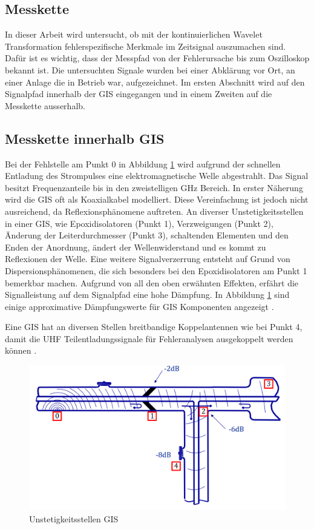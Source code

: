 \begin{refsection}
\section{Messkette}
In dieser Arbeit wird untersucht, ob mit der kontinuierlichen Wavelet Transformation fehlerspezifische Merkmale im Zeitsignal auszumachen sind. 
Dafür ist es wichtig, dass der Messpfad von der Fehlerursache bis zum Oszilloskop bekannt ist. 
Die untersuchten Signale wurden bei einer Abklärung vor Ort, an einer Anlage die in Betrieb war, aufgezeichnet.  
Im ersten Abschnitt wird auf den Signalpfad innerhalb der GIS eingegangen und in einem Zweiten auf die Messkette ausserhalb.
\subsection{Messkette innerhalb GIS}
Bei der Fehlstelle am Punkt 0 in Abbildung \ref{fig:messketteingis} wird aufgrund der schnellen Entladung des Strompulses eine elektromagnetische Welle abgestrahlt. 
Das Signal besitzt Frequenzanteile bis in den zweistelligen GHz Bereich. 
In erster Näherung wird die GIS oft als Koaxialkabel modelliert. 
Diese Vereinfachung ist jedoch nicht ausreichend, da Reflexionsphänomene auftreten. 
An diverser Unstetigkeitsstellen in einer GIS, wie Epoxidisolatoren (Punkt 1), Verzweigungen (Punkt 2),  Änderung der Leiterdurchmesser (Punkt 3), schaltenden Elementen und den Enden der Anordnung, ändert der Wellenwiderstand und es kommt zu Reflexionen der Welle.
Eine weitere Signalverzerrung entsteht auf Grund von Dispersionsphänomenen, die sich besonders bei den Epoxidisolatoren am Punkt 1 bemerkbar machen. 
Aufgrund von all den oben erwähnten Effekten, erfährt die Signalleistung auf dem Signalpfad eine hohe Dämpfung.
In Abbildung \ref{fig:messketteingis} sind einige approximative Dämpfungswerte für GIS Komponenten angezeigt  \cite{report:PDBasicABB}.

Eine GIS hat an diversen Stellen breitbandige Koppelantennen wie bei Punkt 4, damit die UHF Teilentladungssignale für Fehleranalysen ausgekoppelt werden können \cite{buch:UHFSignale, skript:Judd24ps, buch:Kuchler}.
\begin{figure}
	\centering
	\includegraphics[width=0.9\linewidth]{papers/gis/Bilder/MessketteInGIS}
	\caption{Unstetigkeitsstellen GIS \cite{report:PDBasicABB}}
	\label{fig:messketteingis}
\end{figure}

\end{refsection}
